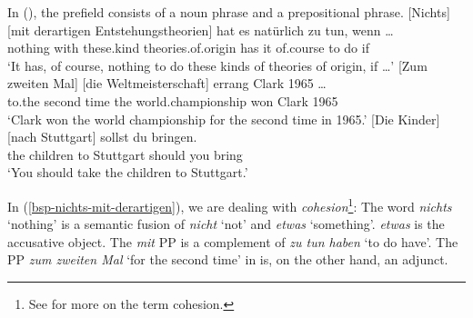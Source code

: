 In (), the prefield consists of a noun phrase and a prepositional phrase.
\eal 
\ex
\gll {}[Nichts] [mit derartigen Entstehungstheorien] hat es natürlich zu tun, wenn \ldots \label{bsp-nichts-mit-derartigen}\footnotemark\\
	 \spacebr{}nothing \spacebr{}with these.kind theories.of.origin has it of.course to do if\\      
\glt `It has, of course, nothing to do these kinds of theories of origin, if \ldots'
\ex 
\gll {}[Zum zweiten Mal] [die Weltmeisterschaft] errang Clark 1965 \ldots\footnotemark\\
	   \spacebr{}to.the second time \spacebr{}the world.championship won Clark 1965 {}\\
\label{bsp-zum-zweiten-mal-die-Weltmeisterschaft}
\glt `Clark won the world championship for the second time in 1965.'
\ex\label{die-kinder-nach-stuttgart}
\gll {}[Die Kinder] [nach Stuttgart] sollst du bringen.\footnotemark\\
     \spacebr{}the children \spacebr{}to Stuttgart should you bring\\
\glt `You should take the children to Stuttgart.'
\zl



\noindent
In (\ref{bsp-nichts-mit-derartigen}), we are dealing with \emph{cohesion}\footnote{%
			See  for more on the term cohesion.
}: The word \emph{nichts} `nothing' is a semantic fusion of  \emph{nicht} `not'
and \emph{etwas} `something'.  \emph {etwas} is the accusative object. The \emph{mit} PP is a
complement of \emph{zu tun haben} `to do have'.
The PP \emph{zum zweiten Mal} `for the second time' in  is, on the other hand,
an adjunct.


\begin{comment}
Reviewer: raus

\citet[\page 69]{Fanselow93a} diskutiert das folgende Beispiel:
\ea
In Hamburg eine Wohnung hätte er sich besser nicht suchen sollen.
\z
Bei diesem Beispiel handelt es sich aber wahrscheinlich im NP-interne Voranstellung, wie sie
\zb von \citet[\page 68]{Fortmann96a-unread-gekauft} für (\mex{1}) in Erwägung gezogen wird:
\ea
Mit der Bahn eine Reise ist nicht geplant.
\z
\citet[\page 133]{Abb94} analysiert solche Voranstellungen als DP-interne Topikalisierungen.
Er ordnet auch folgende Beispiele als umgangsprachlich möglich ein:
\eal
\ex Übermorgen das Spiel gegen Kaiserslautern würde ich gern live sehen.
\ex Der die Karten hat, der Mann, soll gleich kommen.
\ex An der Wand das Bild kommt mir bekannt vor.
\zl
Bei (\mex{0}b) sieht man besonders deutlich, daß es sich nicht um eine Mehrfachbesetzung
des Vorfelds handeln kann, da der Relativsatz ja allein nicht vorfeldfähig ist. Solche Beispiele
sollen in diesem Aufsatz nicht behandelt werden.
\end{comment}

